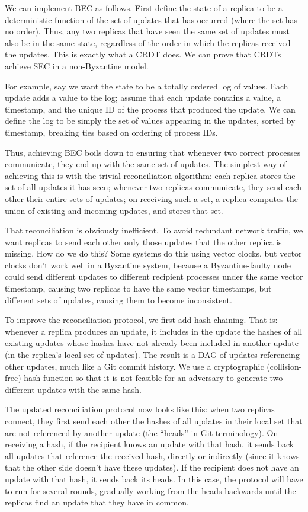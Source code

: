 \documentclass[manuscript]{acmart}
\begin{document}
We can implement BEC as follows. First define the state of a replica to be a deterministic function of the set of updates that has occurred (where the set has no order).
Thus, any two replicas that have seen the same set of updates must also be in the same state, regardless of the order in which the replicas received the updates. This is exactly what a CRDT does.
We can prove that CRDTs achieve SEC in a non-Byzantine model.

For example, say we want the state to be a totally ordered log of values.
Each update adds a value to the log; assume that each update contains a value, a timestamp, and the unique ID of the process that produced the update.
We can define the log to be simply the set of values appearing in the updates, sorted by timestamp, breaking ties based on ordering of process IDs.

Thus, achieving BEC boils down to ensuring that whenever two correct processes communicate, they end up with the same set of updates.
The simplest way of achieving this is with the trivial reconciliation algorithm: each replica stores the set of all updates it has seen; whenever two replicas communicate, they send each other their entire sets of updates; on receiving such a set, a replica computes the union of existing and incoming updates, and stores that set.

That reconciliation is obviously inefficient. To avoid redundant network traffic, we want replicas to send each other only those updates that the other replica is missing.
How do we do this?
Some systems do this using vector clocks, but vector clocks don't work well in a Byzantine system, because a Byzantine-faulty node could send different updates to different recipient processes under the same vector timestamp, causing two replicas to have the same vector timestamps, but different sets of updates, causing them to become inconsistent.

To improve the reconciliation protocol, we first add hash chaining.
That is: whenever a replica produces an update, it includes in the update the hashes of all existing updates whose hashes have not already been included in another update (in the replica's local set of updates).
The result is a DAG of updates referencing other updates, much like a Git commit history.
We use a cryptographic (collision-free) hash function so that it is not feasible for an adversary to generate two different updates with the same hash.

The updated reconciliation protocol now looks like this: when two replicas connect, they first send each other the hashes of all updates in their local set that are not referenced by another update (the ``heads'' in Git terminology).
On receiving a hash, if the recipient knows an update with that hash, it sends back all updates that reference the received hash, directly or indirectly (since it knows that the other side doesn't have these updates).
If the recipient does not have an update with that hash, it sends back its heads.
In this case, the protocol will have to run for several rounds, gradually working from the heads backwards until the replicas find an update that they have in common.
\end{document}
